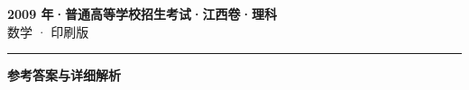\documentclass[zihao=5, a4paper]{ctexart}
\begin{document}
\begin{center}
  {\Large\bfseries 2009 年·普通高等学校招生考试·江西卷·理科}\\[4pt]
  {\large 数学 · 印刷版}
\end{center}
\medskip
{}

\par\bigskip\hrule\bigskip
{}
\begin{center}{\large\bfseries 参考答案与详细解析}\end{center}
\smallskip

\end{document}
